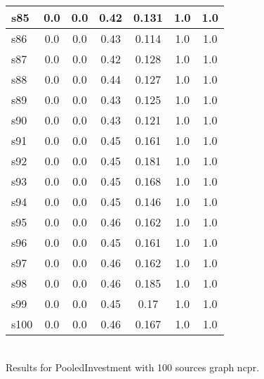 \documentclass{article}
\begin{document}
\begin{tabular}{|l|c|c|c|c|c|c|}
\hline
s85 &0.0 & 0.0 & 0.42 & 0.131 & 1.0 & 1.0\\
\hline
s86 &0.0 & 0.0 & 0.43 & 0.114 & 1.0 & 1.0\\
\hline
s87 &0.0 & 0.0 & 0.42 & 0.128 & 1.0 & 1.0\\
\hline
s88 &0.0 & 0.0 & 0.44 & 0.127 & 1.0 & 1.0\\
\hline
s89 &0.0 & 0.0 & 0.43 & 0.125 & 1.0 & 1.0\\
\hline
s90 &0.0 & 0.0 & 0.43 & 0.121 & 1.0 & 1.0\\
\hline
s91 &0.0 & 0.0 & 0.45 & 0.161 & 1.0 & 1.0\\
\hline
s92 &0.0 & 0.0 & 0.45 & 0.181 & 1.0 & 1.0\\
\hline
s93 &0.0 & 0.0 & 0.45 & 0.168 & 1.0 & 1.0\\
\hline
s94 &0.0 & 0.0 & 0.45 & 0.146 & 1.0 & 1.0\\
\hline
s95 &0.0 & 0.0 & 0.46 & 0.162 & 1.0 & 1.0\\
\hline
s96 &0.0 & 0.0 & 0.45 & 0.161 & 1.0 & 1.0\\
\hline
s97 &0.0 & 0.0 & 0.46 & 0.162 & 1.0 & 1.0\\
\hline
s98 &0.0 & 0.0 & 0.46 & 0.185 & 1.0 & 1.0\\
\hline
s99 &0.0 & 0.0 & 0.45 & 0.17 & 1.0 & 1.0\\
\hline
s100 &0.0 & 0.0 & 0.46 & 0.167 & 1.0 & 1.0\\
\hline
\end{tabular}\\

\noindent Results for PooledInvestment with 100 sources graph ncpr.
\end{document}
